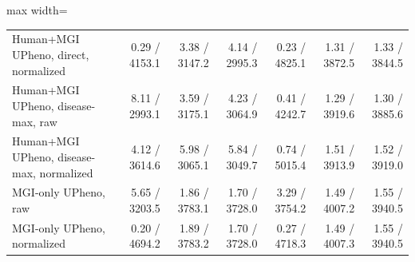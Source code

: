 \begin{landscape}
\begin{table}[p]
\begin{adjustbox}{max width=\linewidth}
\begin{tabular}{lrrrrrr}
Human+MGI UPheno, direct, normalized & 0.29 / 4153.1 & 3.38 / 3147.2 & 4.14 / 2995.3 & 0.23 / 4825.1 & 1.31 / 3872.5 & 1.33 / 3844.5 \\
Human+MGI UPheno, disease-max, raw & 8.11 / 2993.1 & 3.59 / 3175.1 & 4.23 / 3064.9 & 0.41 / 4242.7 & 1.29 / 3919.6 & 1.30 / 3885.6 \\
Human+MGI UPheno, disease-max, normalized & 4.12 / 3614.6 & 5.98 / 3065.1 & 5.84 / 3049.7 & 0.74 / 5015.4 & 1.51 / 3913.9 & 1.52 / 3919.0 \\
MGI-only UPheno, raw & 5.65 / 3203.5 & 1.86 / 3783.1 & 1.70 / 3728.0 & 3.29 / 3754.2 & 1.49 / 4007.2 & 1.55 / 3940.5 \\
MGI-only UPheno, normalized & 0.20 / 4694.2 & 1.89 / 3783.2 & 1.70 / 3728.0 & 0.27 / 4718.3 & 1.49 / 4007.3 & 1.55 / 3940.5 \\
\bottomrule
\end{tabular}
\end{adjustbox}
\end{table}
\clearpage
\end{landscape}
